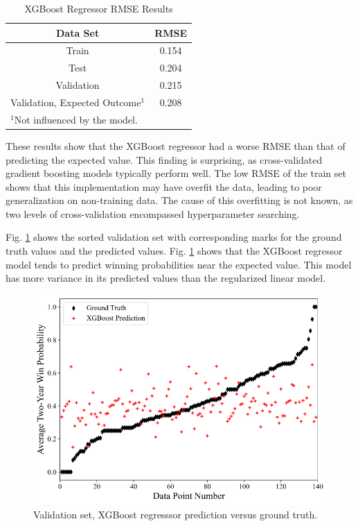 \documentclass[conference]{IEEEtran}
\begin{document}
\begin{table}[htbp]
\caption{XGBoost Regressor RMSE Results}
\begin{center}
\begin{tabular}{|c||c|}
\hline
\textbf{Data Set} & \textbf{RMSE} \\
\hline
\hline
Train & 0.154 \\
\hline
Test & 0.204 \\
\hline
Validation & 0.215 \\
\hline
Validation, Expected Outcome$^{\mathrm{1}}$ & 0.208 \\
\hline
\multicolumn{2}{l}{$^{\mathrm{1}}$Not influenced by the model.}
\end{tabular}
\label{tab5}
\end{center}
\end{table}

These results show that the XGBoost regressor had a worse RMSE than that of predicting the expected value. This finding is surprising, as cross-validated gradient boosting models typically perform well. The low RMSE of the train set shows that this implementation may have overfit the data, leading to poor generalization on non-training data. The cause of this overfitting is not known, as two levels of cross-validation encompassed hyperparameter searching.

Fig. \ref{fig6} shows the sorted validation set with corresponding marks for the ground truth values and the predicted values.  Fig. \ref{fig6} shows that the XGBoost regressor model tends to predict winning probabilities near the expected value. This model has more variance in its predicted values than the regularized linear model. 

\begin{figure}[htbp]
\centerline{\includegraphics[width=1\linewidth]{test2.png}}
\caption{Validation set, XGBoost regresssor prediction versus ground truth.}
\label{fig6}
\end{figure}
\end{document}
